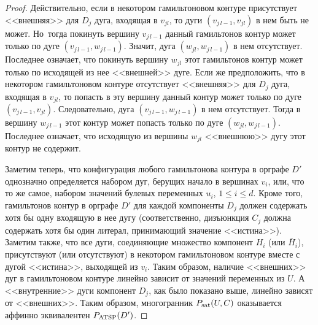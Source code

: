 \begin{proof}
{\sloppy
Действительно, если в некотором гамильтоновом контуре присутствует <<внешняя>> для $D_j$ дуга, входящая в $v_{jl}$, то дуги $(v_{j \, l-1}, v_{j l})$ в нем быть не может. Но~тогда покинуть вершину $v_{j \, l-1}$ данный гамильтонов контур может только по дуге $(v_{j\,l-1}, w_{j\,l-1})$. Значит, дуга $(w_{j l}, w_{j \, l-1})$ в нем отсутствует. Последнее означает, что покинуть вершину $w_{j l}$ этот гамильтонов контур может только по исходящей из нее <<внешней>> дуге.
Если же предположить, что в некотором гамильтоновом контуре отсутствует <<внешняя>> для $D_j$ дуга, входящая в $v_{jl}$, то попасть в эту вершину данный контур может только по дуге $(v_{j \, l-1}, v_{j l})$. Следовательно, дуга $(v_{j\,l-1}, w_{j\,l-1})$ в нем отсутствует. Тогда в вершину $w_{j \, l-1}$ этот контур может попасть только по дуге $(w_{j l}, w_{j \, l-1})$. Последнее означает, что исходящую из вершины $w_{j l}$ <<внешнюю>> дугу этот контур не содержит.

}

Заметим теперь, что конфигурация любого гамильтонова контура в орграфе $D'$ однозначно определяется набором дуг, берущих начало в вершинах $v_i$, или, что то же самое, набором значений булевых переменных $u_i$, $1\le i \le d$.
Кроме того, гамильтонов контур в орграфе $D'$ для каждой компоненты $D_j$ должен содержать хотя бы одну входящую в нее дугу (соответственно, дизъюнкция $C_j$ должна содержать хотя бы один литерал, принимающий значение <<истина>>).
Заметим также, что все дуги, соединяющие множество компонент $H_i$ (или $\bar{H}_i$), присутствуют (или отсутствуют) в некотором гамильтоновом контуре вместе с дугой <<истина>>, выходящей из $v_i$.
Таким образом, наличие <<внешних>> дуг в гамильтоновом контуре линейно зависит от значений переменных из $U$.
А <<внутренние>> дуги компонент $D_j$, как было показано выше, линейно зависят от <<внешних>>.
Таким образом, многогранник $P_{\textup{sat}}(U,C)$ оказывается аффинно эквивалентен $P_{\textup{ATSP}}(D')$.
\end{proof}

